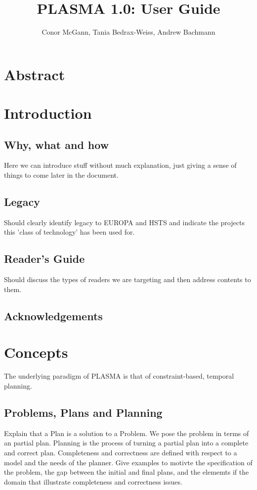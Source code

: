 \documentclass[10pt, letterpaper, twoside]{article}
\author{Conor McGann, Tania Bedrax-Weiss, Andrew Bachmann}
\title{PLASMA 1.0: User Guide}
\begin{document}
\maketitle

\section{Abstract}

\section{Introduction}
\subsection{Why, what and how}
Here we can introduce stuff without much explanation, just giving a sense of things to come later in the document.
\subsection{Legacy}
Should clearly identify legacy to EUROPA and HSTS and indicate the projects this 'class of technology' has been used for.
\subsection{Reader's Guide}
Should discuss the types of readers we are targeting and then address contents to them.
\subsection{Acknowledgements}

\section{Concepts}
The underlying paradigm of PLASMA is that of constraint-based, temporal planning.
\subsection{Problems, Plans and Planning}
Explain that a Plan is a solution to a Problem. We pose the problem in terms of an partial plan. Planning is the process of turning a partial plan into a complete and correct plan. Completeness and correctness are defined with respect to a model and the needs of the planner. Give examples to motivte the specification of the problem, the gap between the initial and final plans, and the elememts if the domain that illustrate completeness and correctness issues.
\end{document}
